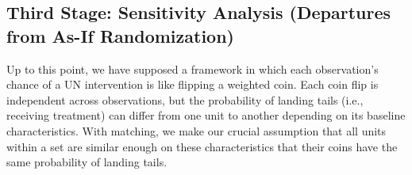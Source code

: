 \documentclass[
  12pt,
  leqno]{article}
\newenvironment{Shaded}{\begin{snugshade}}{\end{snugshade}}
\newcommand{\AttributeTok}[1]{\textcolor[rgb]{0.13,0.29,0.53}{#1}}
\newcommand{\CommentTok}[1]{\textcolor[rgb]{0.56,0.35,0.01}{\textit{#1}}}
\newcommand{\ConstantTok}[1]{\textcolor[rgb]{0.56,0.35,0.01}{#1}}
\newcommand{\DecValTok}[1]{\textcolor[rgb]{0.00,0.00,0.81}{#1}}
\newcommand{\FunctionTok}[1]{\textcolor[rgb]{0.13,0.29,0.53}{\textbf{#1}}}
\newcommand{\NormalTok}[1]{#1}
\newcommand{\OtherTok}[1]{\textcolor[rgb]{0.56,0.35,0.01}{#1}}
\newcommand{\SpecialCharTok}[1]{\textcolor[rgb]{0.81,0.36,0.00}{\textbf{#1}}}
\begin{document}
\singlespacing

\begin{Shaded}
\end{Shaded}

\doublespacing

\subsection{Third Stage: Sensitivity Analysis (Departures from As-If
Randomization)}\label{third-stage-sensitivity-analysis-departures-from-as-if-randomization}

Up to this point, we have supposed a framework in which each
observation's chance of a UN intervention is like flipping a weighted
coin. Each coin flip is independent across observations, but the
probability of landing tails (i.e., receiving treatment) can differ from
one unit to another depending on its baseline characteristics. With
matching, we make our crucial assumption that all units within a set are
similar enough on these characteristics that their coins have the same
probability of landing tails.
\end{document}
